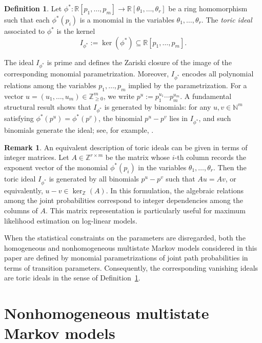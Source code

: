 \documentclass[11pt, a4paper]{article}
\numberwithin{equation}{section}
\theoremstyle{plain}
\theoremstyle{definition}
\newtheorem{definition}[theorem]{Definition}
\newtheorem{remark}[theorem]{Remark}
\renewcommand{\emph}[1]{\textit{#1}}
\begin{document}
\begin{definition}
\label{def:toric}
Let
$\phi^* : \mathbb{R}[p_1,\ldots,p_m] \longrightarrow \mathbb{R}[\theta_1,\ldots,\theta_r]$
be a ring homomorphism such that each $\phi^*(p_i)$ is a monomial in the variables
$\theta_1,\ldots,\theta_r$. The \emph{toric ideal} associated to $\phi^*$ is the kernel
\[
I_{\phi^*} := \ker(\phi^*) \subseteq \mathbb{R}[p_1,\ldots,p_m].
\]
\end{definition}


The ideal $I_{\phi^*}$ is prime and defines the Zariski closure of the image of the corresponding
monomial parametrization. Moreover, $I_{\phi^*}$ encodes all polynomial relations among the
variables $p_1,\ldots,p_m$ implied by the parametrization. For a vector
$u=(u_1,\ldots,u_m)\in\mathbb{Z}_{\ge 0}^m$, we write $p^u := p_1^{u_1}\cdots p_m^{u_m}$.
A fundamental structural result shows that $I_{\phi^*}$ is generated by binomials: for any
$u,v\in\mathbb{N}^m$ satisfying $\phi^*(p^u)=\phi^*(p^v)$, the binomial $p^u-p^v$ lies in
$I_{\phi^*}$, and such binomials generate the ideal; see, for example,
\cite[Proposition~6.2.4]{sullivant2023algebraic}.

\begin{remark}\label{rem:matrix_rep_toric}
An equivalent description of toric ideals can be given in terms of integer matrices.
Let $A\in\mathbb{Z}^{r\times m}$ be the matrix whose $i$-th column records the exponent vector of
the monomial $\phi^*(p_i)$ in the variables $\theta_1,\ldots,\theta_r$. Then the toric ideal
$I_{\phi^*}$ is generated by all binomials $p^u-p^v$ such that $Au=Av$, or equivalently,
$u-v\in\ker_{\mathbb{Z}}(A)$. In this formulation, the algebraic relations among the joint
probabilities correspond to integer dependencies among the columns of $A$. This matrix representation is particularly useful for maximum likelihood estimation on log-linear models.
\end{remark}

When the statistical constraints on the parameters are disregarded, both the homogeneous and nonhomogeneous multistate Markov models considered in this paper are defined by monomial parametrizations of joint path probabilities in terms of transition parameters.
Consequently, the corresponding vanishing ideals are toric ideals in the sense of
Definition~\ref{def:toric}. 

\section{Nonhomogeneous multistate Markov models} \label{sec:implicitization_nonhomogeneous}
\end{document}
